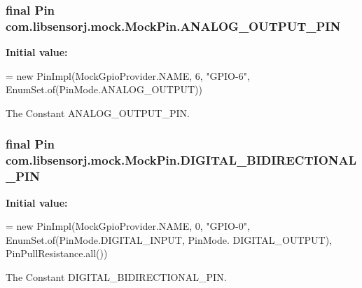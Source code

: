 \subsubsection[{A\+N\+A\+L\+O\+G\+\_\+\+O\+U\+T\+P\+U\+T\+\_\+\+P\+I\+N}]{\setlength{\rightskip}{0pt plus 5cm}final Pin com.\+libsensorj.\+mock.\+Mock\+Pin.\+A\+N\+A\+L\+O\+G\+\_\+\+O\+U\+T\+P\+U\+T\+\_\+\+P\+I\+N\hspace{0.3cm}{\ttfamily [static]}}\label{classcom_1_1libsensorj_1_1mock_1_1MockPin_ac0cb98f53fad4d229f1999253428e252}
{\bfseries Initial value\+:}
\begin{DoxyCode}
= \textcolor{keyword}{new} PinImpl(MockGpioProvider.NAME, 6, \textcolor{stringliteral}{"GPIO-6"}, 
                                                            EnumSet.of(PinMode.ANALOG\_OUTPUT))
\end{DoxyCode}
The Constant A\+N\+A\+L\+O\+G\+\_\+\+O\+U\+T\+P\+U\+T\+\_\+\+P\+I\+N. \hypertarget{classcom_1_1libsensorj_1_1mock_1_1MockPin_a4dc35775be540ac9c62c2797c08a7ed7}{}
\subsubsection[{D\+I\+G\+I\+T\+A\+L\+\_\+\+B\+I\+D\+I\+R\+E\+C\+T\+I\+O\+N\+A\+L\+\_\+\+P\+I\+N}]{\setlength{\rightskip}{0pt plus 5cm}final Pin com.\+libsensorj.\+mock.\+Mock\+Pin.\+D\+I\+G\+I\+T\+A\+L\+\_\+\+B\+I\+D\+I\+R\+E\+C\+T\+I\+O\+N\+A\+L\+\_\+\+P\+I\+N\hspace{0.3cm}{\ttfamily [static]}}\label{classcom_1_1libsensorj_1_1mock_1_1MockPin_a4dc35775be540ac9c62c2797c08a7ed7}
{\bfseries Initial value\+:}
\begin{DoxyCode}
= \textcolor{keyword}{new} PinImpl(MockGpioProvider.NAME, 0, \textcolor{stringliteral}{"GPIO-0"}, 
                                                            EnumSet.of(PinMode.DIGITAL\_INPUT, PinMode.
      DIGITAL\_OUTPUT),
                                                            PinPullResistance.all())
\end{DoxyCode}
The Constant D\+I\+G\+I\+T\+A\+L\+\_\+\+B\+I\+D\+I\+R\+E\+C\+T\+I\+O\+N\+A\+L\+\_\+\+P\+I\+N. \hypertarget{classcom_1_1libsensorj_1_1mock_1_1MockPin_ab3330359048ec50eec255e0ab6309f48}{}

